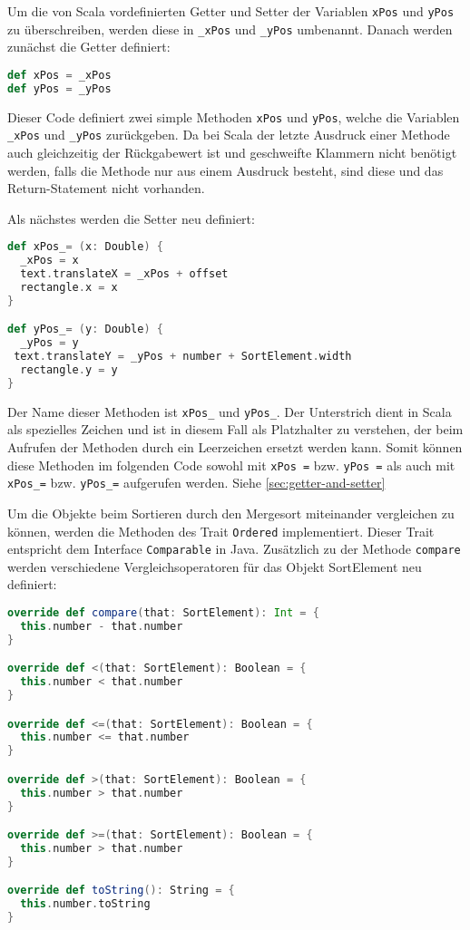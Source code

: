 Um die von Scala vordefinierten Getter und Setter der Variablen \texttt{xPos} und \texttt{yPos} zu überschreiben, werden diese in \texttt{\_xPos} und
\texttt{\_yPos} umbenannt. Danach werden zunächst die Getter definiert:

\begin{lstlisting}[language=Scala,caption=Definiert die Setter Methoden]
def xPos = _xPos
def yPos = _yPos
\end{lstlisting}

Dieser Code definiert zwei simple Methoden \texttt{xPos} und \texttt{yPos}, welche die Variablen \texttt{\_xPos} und \texttt{\_yPos} zurückgeben. Da bei Scala der letzte Ausdruck einer Methode auch gleichzeitig der Rückgabewert ist und geschweifte Klammern nicht benötigt werden, falls die Methode nur aus einem Ausdruck besteht, sind diese und das Return-Statement nicht vorhanden.

Als nächstes werden die Setter neu definiert:

\begin{lstlisting}[language=Scala]
def xPos_= (x: Double) {
  _xPos = x
  text.translateX = _xPos + offset
  rectangle.x = x
}

def yPos_= (y: Double) {
  _yPos = y
 text.translateY = _yPos + number + SortElement.width
  rectangle.y = y
}
\end{lstlisting}

Der Name dieser Methoden ist \texttt{xPos\_} und \texttt{yPos\_}. Der Unterstrich dient in Scala als spezielles Zeichen und ist in diesem Fall als Platzhalter zu verstehen, der beim Aufrufen der Methoden durch ein Leerzeichen ersetzt werden kann. Somit können diese Methoden im folgenden Code sowohl mit \texttt{xPos =}  bzw. \texttt{yPos =} als auch mit \texttt{xPos\_=} bzw. \texttt{yPos\_=} aufgerufen werden. Siehe \ref{sec:getter-and-setter}

Um die Objekte beim Sortieren durch den Mergesort miteinander vergleichen zu können, werden die Methoden des Trait \texttt{Ordered} implementiert. Dieser Trait entspricht dem Interface \texttt{Comparable} in Java. Zusätzlich zu der Methode \texttt{compare} werden verschiedene Vergleichsoperatoren für das Objekt SortElement neu definiert:

\begin{lstlisting}[language=Scala,caption=Überschriebene Methoden]
override def compare(that: SortElement): Int = {
  this.number - that.number
}

override def <(that: SortElement): Boolean = {
  this.number < that.number
}

override def <=(that: SortElement): Boolean = {
  this.number <= that.number
}

override def >(that: SortElement): Boolean = {
  this.number > that.number
}

override def >=(that: SortElement): Boolean = {
  this.number > that.number
}

override def toString(): String = {
  this.number.toString
}
\end{lstlisting}

